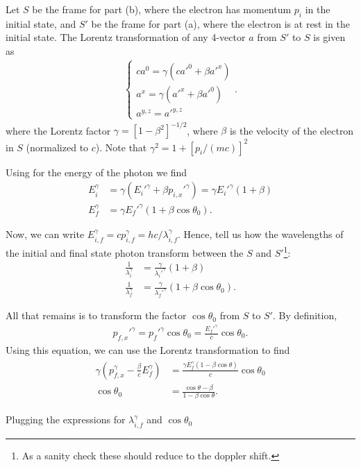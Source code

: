 {Let $S$ be the frame for part (b), where the electron has momentum $p_{i}$ in the initial state, and $S'$ be the frame for part (a), where the electron is at rest in the initial state.
The Lorentz transformation of any 4-vector $a$ from $S'$ to $S$ is given as
\begin{eqnarray}
\label{eq:lorentz-transform}
   \begin{cases}
   c a^{0} = \gamma (c a'^{0} + \beta a'^{x}) \\
   a^{x}  = \gamma (a'^{x} + \beta a'^{0}) \\
   a^{y,z} = a'^{y,z}
   \end{cases} 
.\end{eqnarray}
where the Lorentz factor $\gamma = [1 - \beta^2]^{-1/2}$, where $\beta$ is the velocity of the electron in $S$ (normalized to $c$).
Note that $\gamma^2 = 1 + [p_{i}/(mc)]^2$

Using  for the energy of the photon we find
\begin{align}
    \label{eq:initial-transform}
    E_{i}^{\gamma} &= \gamma ( E_{i}'^{\gamma} + \beta p_{i,x}'^{\gamma} ) = \gamma E_{i}'^{\gamma} (1 + \beta) \\
    \label{eq:final-transform}
    E_{f}^{\gamma} &= \gamma E_{f}'^{\gamma} (1 + \beta \cos{\theta_0})
.\end{align}

Now, we can write $E_{i,f}^{\gamma} = c p_{i,f}^{\gamma} = hc/\lambda_{i,f}^{\gamma}$.
Hence,  tell us how the wavelengths of the initial and final state photon transform between the $S$ and $S'$\footnote{As a sanity check these should reduce to the doppler shift.}:
\begin{align}
    \frac{1}{\lambda_{i}^{\gamma}} &= \frac{\gamma}{\lambda_{i}'^{\gamma}} (1+\beta) \\
    \frac{1}{\lambda_{f}^{\gamma}} &= \frac{\gamma}{\lambda_{f}'^{\gamma}} (1+\beta \cos{\theta_0})
.\end{align}

All that remains is to transform the factor $\cos{\theta_0}$ from $S$ to $S'$.
By definition,
\begin{eqnarray}
    p_{f,x}'^{\gamma} = p_{f}'^{\gamma} \cos{\theta_0} = \frac{E_{f}'^{\gamma}}{c} \cos{\theta_0}
.\end{eqnarray}
Using this equation, we can use the Lorentz transformation to find
\begin{eqnarray}
    \begin{aligned}
        \gamma ( p_{f,x}^{\gamma} - \frac{\beta}{c} E_{f}^{\gamma} ) &= \frac{\gamma E_{f}^{\gamma} ( 1 - \beta \cos{\theta} )}{c} \cos{\theta_0} \\
    \cos{\theta_0} &= \frac{\cos{\theta} - \beta}{1 - \beta \cos{\theta}}
    .\end{aligned}
\end{eqnarray}

Plugging the expressions for $\lambda_{i,f}^{\gamma}$ and $\cos{\theta_0}$

}






